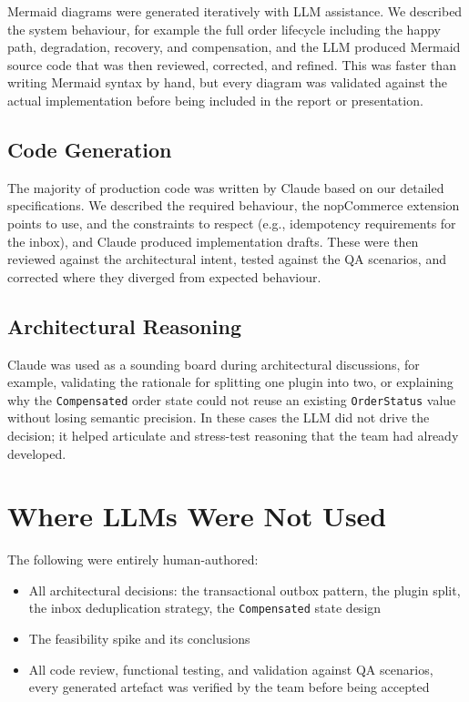 Mermaid diagrams were generated iteratively with LLM assistance. We described the system behaviour, for example the full order lifecycle including the happy path, degradation, recovery, and compensation, and the LLM produced Mermaid source code that was then reviewed, corrected, and refined. This was faster than writing Mermaid syntax by hand, but every diagram was validated against the actual implementation before being included in the report or presentation.

\subsection{Code Generation}

The majority of production code was written by Claude based on our detailed specifications. We described the required behaviour, the nopCommerce extension points to use, and the constraints to respect (e.g., idempotency requirements for the inbox), and Claude produced implementation drafts. These were then reviewed against the architectural intent, tested against the QA scenarios, and corrected where they diverged from expected behaviour.

\subsection{Architectural Reasoning}

Claude was used as a sounding board during architectural discussions, for example, validating the rationale for splitting one plugin into two, or explaining why the \texttt{Compensated} order state could not reuse an existing \texttt{OrderStatus} value without losing semantic precision. In these cases the LLM did not drive the decision; it helped articulate and stress-test reasoning that the team had already developed.

\section{Where LLMs Were Not Used}

The following were entirely human-authored:

\begin{itemize}
    \item All architectural decisions: the transactional outbox pattern, the plugin split, the inbox deduplication strategy, the \texttt{Compensated} state design
    \item The feasibility spike and its conclusions
    \item All code review, functional testing, and validation against QA scenarios, every generated artefact was verified by the team before being accepted
\end{itemize}

